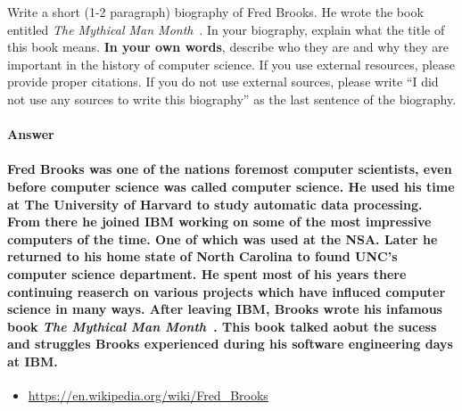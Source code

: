 \documentclass{article}
\begin{document}

Write a short (1-2 paragraph) biography of Fred Brooks.  He wrote the book
entitled \emph{The Mythical Man Month}~\cite{brooks-manmonth}.  In your
biography, explain what the title of this book means.
\textbf{In your own words}, describe who they are and why they are important in
the history of computer science.  If you use external resources, please provide
proper citations. If you do not use external sources, please write ``I did not
use any sources to write this biography'' as the last sentence of the
biography.

\paragraph{Answer}
	\paragraph{
Fred Brooks was one of the nations foremost computer scientists, even before computer science was called computer science. He used his time at The University of Harvard to study automatic data processing. From there he joined IBM working on some of the most impressive computers of the time. One of which was used at the NSA. Later he returned to his home state of North Carolina to found UNC's computer science department. He spent most of his years there continuing reaserch on various projects which have influced computer science in many ways. After leaving IBM, Brooks wrote his infamous book \emph{The Mythical Man Month}~\cite{brooks-manmonth}. This book talked aobut the sucess and struggles Brooks experienced during his software engineering days at IBM.}


\newpage


\begin{itemize}
	\item \url{https://en.wikipedia.org/wiki/Fred_Brooks}
\end{itemize}
\end{document}
